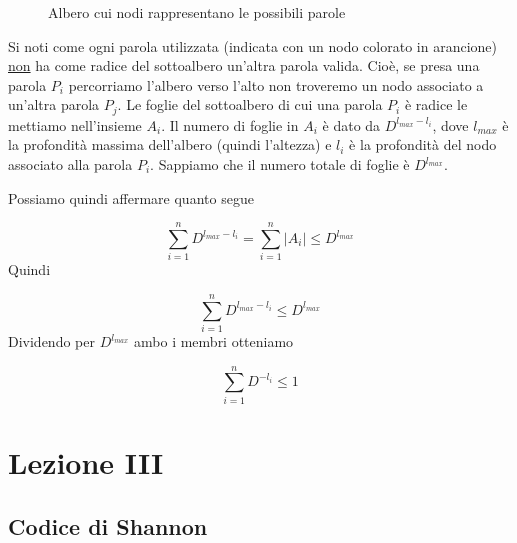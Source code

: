 \documentclass[12pt]{report}
\begin{document}
\begin{dimo}
\begin{figure}
\begin{center}
{{
                    }
                }
            \end{center}
            \caption{Albero cui nodi rappresentano le possibili parole}
        \end{figure}
    \end{dimo}

    \noindent
    Si noti come ogni parola utilizzata (indicata con un nodo colorato in arancione) \underline{non} ha come radice del sottoalbero un'altra parola valida. Cioè, se presa una parola $P_i$ percorriamo l'albero verso l'alto non troveremo un nodo associato a un'altra parola $P_j$.
    Le foglie del sottoalbero di cui una parola $P_i$ è radice le mettiamo nell'insieme $A_i$. Il numero di foglie in $A_i$ è dato da $D^{l_{max} - l_i}$, dove $l_{max}$ è la profondità massima dell'albero (quindi l'altezza) e $l_i$ è la profondità del nodo associato alla parola $P_i$. Sappiamo che il numero totale di foglie è $D^{l_{max}}$.

    Possiamo quindi affermare quanto segue

    $$\sum_{i = 1}^n D^{l_{max} - l_i} = \sum_{i = 1}^n |A_i| \leq D^{l_{max}}$$
    Quindi

    $$\sum_{i = 1}^n D^{l_{max} - l_i}\leq D^{l_{max}}$$
    Dividendo per $D^{l_{max}}$ ambo i membri otteniamo

    $$\sum_{i = 1}^n D^{-l_i} \leq 1$$

    \chapter{Lezione III}
    \label{cap:Lezione III}

    \section{Codice di Shannon}
\end{document}
